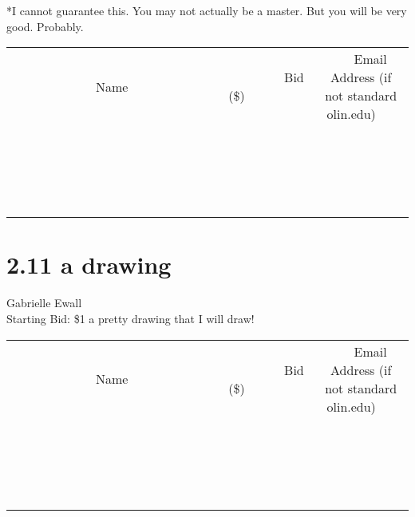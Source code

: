 \documentclass[11pt]{article}
\begin{document}
*I cannot guarantee this. You may not actually be a master. But you will be very good. Probably.
\\[3ex]
\begin{tabular}{c c c}
~~~~~~~~~~~~~Name~~~~~~~~~~~~~ & ~~~~~~~~~Bid (\$)~~~~~~~~~  & ~~~Email Address (if not standard olin.edu)~~~\\
 & & \\
\hline
 & & \\
\hline
 & & \\
\hline
 & & \\
\hline
 & & \\
\hline
 & & \\
\hline
 & & \\
\hline
 & & \\
\hline
 & & \\
\hline
 & & \\
\hline
 & & \\
\hline
 & & \\
\hline
 & & \\
\hline
 & & \\
\hline
 & & \\
\hline
 & & \\
\hline
 & & \\
\hline
 & & \\
\hline
 & & \\
\hline
\end{tabular}
\newpage
\section*{2.11 a drawing}
Gabrielle Ewall
\\
Starting Bid: \$1
\newline
a pretty drawing that I will draw!
\\[3ex]
\begin{tabular}{c c c}
~~~~~~~~~~~~~Name~~~~~~~~~~~~~ & ~~~~~~~~~Bid (\$)~~~~~~~~~  & ~~~Email Address (if not standard olin.edu)~~~\\
 & & \\
\hline
 & & \\
\hline
 & & \\
\hline
 & & \\
\hline
 & & \\
\hline
 & & \\
\hline
 & & \\
\hline
 & & \\
\hline
 & & \\
\hline
 & & \\
\hline
 & & \\
\hline
 & & \\
\hline
 & & \\
\hline
 & & \\
\hline
 & & \\
\hline
 & & \\
\hline
 & & \\
\hline
 & & \\
\hline
 & & \\
\hline
\end{tabular}
\newpage
\end{document}
